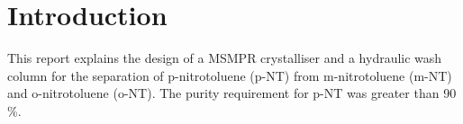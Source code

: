 \section{Introduction}

This report explains the design of a MSMPR crystalliser and a hydraulic wash column for the separation of p-nitrotoluene (p-NT) from m-nitrotoluene (m-NT) and o-nitrotoluene (o-NT). The purity requirement for p-NT was greater than 90 \%. 

